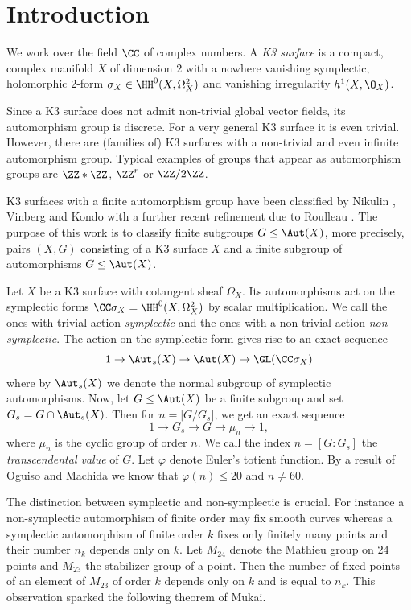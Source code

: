 \section{Introduction}
We work over the field $\CC$ of complex numbers.
A \emph{K3 surface} is a compact, complex manifold $X$ of dimension $2$ with a nowhere vanishing symplectic, holomorphic $2$-form $\sigma_X \in \HH^0(X,\Omega^2_X)$ and vanishing irregularity $h^1(X,\O_X)$.

Since a K3 surface does not admit non-trivial global vector fields, its automorphism group is discrete. For a very general K3 surface it is even trivial. However, there are (families of) K3 surfaces with a non-trivial and even infinite automorphism group. Typical examples of groups that appear as automorphism groups are $\ZZ * \ZZ$, $\ZZ^r$ or $\ZZ/2 \ZZ$.

K3 surfaces with a finite automorphism group have been classified by Nikulin \cite{nikulin1981,nikulin1984}, Vinberg \cite{vinberg2007} and Kondo \cite{kondo1989} with a further recent refinement due to Roulleau \cite{Roulleau2021}.
The purpose of this work is to classify finite subgroups
$G \leq \Aut(X)$, more precisely, pairs $(X,G)$ consisting of a K3 surface $X$ and a finite subgroup of automorphisms $G \leq \Aut(X)$.

Let $X$ be a K3 surface with cotangent sheaf $\Omega_X$. Its automorphisms act on the symplectic forms $\CC \sigma_X = \HH^0(X,\Omega^2_X)$ by scalar multiplication. We call the ones with trivial action \emph{symplectic} and the ones with a non-trivial action \emph{non-symplectic}.
The action on the symplectic form gives rise to an exact sequence
\[1 \to \Aut_s(X) \to \Aut(X) \to \GL(\CC \sigma_X)\]
where by $\Aut_s(X)$ we denote the normal subgroup of symplectic automorphisms.
Now, let $G \leq \Aut(X)$ be a finite subgroup and set $G_s = G \cap \Aut_s(X)$. Then for $n = |G/G_s|$, we get an exact sequence
\[1 \to G_s \to G \to \mu_n \to 1, \]
where $\mu_n$ is the cyclic group of order $n$. We call the index $n = [G:G_s]$ the \emph{transcendental value} of $G$.
Let $\varphi$ denote Euler's totient function. By a result of Oguiso and Machida \cite{Oguiso-Machida1998} we know that $\varphi(n) \leq 20$ and $n\neq 60$.

The distinction between symplectic and non-symplectic is crucial. For instance a non-symplectic automorphism of finite order may fix smooth curves whereas
a symplectic automorphism of finite order $k$ fixes only finitely many points and their number $n_k$ depends only on $k$.
Let $M_{24}$ denote the Mathieu group on $24$ points and $M_{23}$ the stabilizer group of a point. Then the number of fixed points of an element of $M_{23}$ of order $k$ depends only on $k$ and is equal to $n_k$. This observation sparked the following theorem of Mukai.

